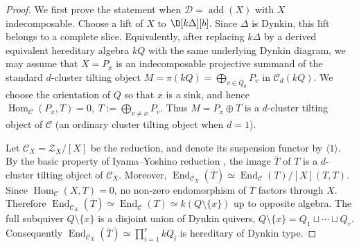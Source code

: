 \documentclass[12pt]{article}
\theoremstyle{plain}
\theoremstyle{definition}
\DeclareMathOperator{\add}{add}
\DeclareMathOperator{\End}{End}
\DeclareMathOperator{\Hom}{Hom}
\newcommand{\Db}[1][]{\D[#1][b]}
\begin{document}
\begin{proof}
We first prove the statement when \(\mathcal D=\add(X)\) with \(X\)
indecomposable.  Choose a lift of \(X\) to \(\Db[k\Delta]\).  Since \(\Delta\)
is Dynkin, this lift belongs to a complete slice.  Equivalently, after replacing
\(k\Delta\) by a derived equivalent hereditary algebra \(kQ\) with the same
underlying Dynkin diagram, we may assume that
\(X=P_x\)
is an indecomposable projective summand of the standard \(d\)-cluster tilting
object
\(M=\pi(kQ)=\bigoplus_{v\in Q_0}P_v\)
in \(\mathcal C_d(kQ)\).  We choose the orientation of \(Q\) so that \(x\) is a
sink, and hence
\(\Hom_{\mathcal C}(P_x,T)=0,\ T:=\bigoplus_{v\ne x}P_v .\)
Thus \(M=P_x\oplus T\) is a \(d\)-cluster tilting object of \(\mathcal C\)
(an ordinary cluster tilting object when \(d=1\)).

Let \(\mathcal C_X=\mathcal Z_X/[X]\) be the reduction, and denote its
suspension functor by \(\langle1\rangle\).  By the basic property of
Iyama--Yoshino reduction \cite{Iyama2008ac}, the image \(\overline T\) of
\(T\) is a \(d\)-cluster tilting object of \(\mathcal C_X\).  Moreover,
\(\End_{\mathcal C_X}(\overline T)\simeq \End_{\mathcal C}(T)/[X](T,T).\)
Since \(\Hom_{\mathcal C}(X,T)=0\), no non-zero endomorphism of \(T\) factors
through \(X\).  Therefore
\(\End_{\mathcal C_X}(\overline T)\simeq \End_{\mathcal C}(T)\simeq
k(Q\setminus\{x\})\)
up to opposite algebra.  The full subquiver \(Q\setminus\{x\}\) is a disjoint
union of Dynkin quivers,
\(Q\setminus\{x\}=Q_1\sqcup\cdots\sqcup Q_r.\)
Consequently \(\End_{\mathcal C_X}(\overline T)\simeq\prod_{i=1}^r kQ_i\) is
hereditary of Dynkin type.


\end{proof}
\end{document}

